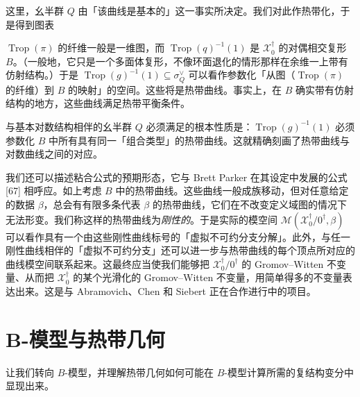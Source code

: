 这里，幺半群 $Q$ 由「该曲线是基本的」这一事实所决定。我们对此作热带化，于是得到图表
\begin{center}
\end{center}

$\operatorname{Trop}(\pi)$ 的纤维一般是一维图，而 $\operatorname{Trop}(q)^{-1}(1)$ 是 $\mathcal{X}_0^\dagger$ 的对偶相交复形 $B$。（一般地，它只是一个多面体复形，不像环面退化的情形那样在余维一上带有仿射结构。）于是 $\operatorname{Trop}(g)^{-1}(1)\subseteq\sigma_Q^\vee$ 可以看作参数化「从图（$\operatorname{Trop}(\pi)$ 的纤维）到 $B$ 的映射」的空间。这些将是热带曲线。事实上，在 $B$ 确实带有仿射结构的地方，这些曲线满足热带平衡条件。

与基本对数结构相伴的幺半群 $Q$ 必须满足的根本性质是：$\operatorname{Trop}(g)^{-1}(1)$ 必须参数化 $B$ 中所有具有同一「组合类型」的热带曲线。这就精确刻画了热带曲线与对数曲线之间的对应。

我们还可以描述粘合公式的预期形态，它与 Brett Parker 在其设定中发展的公式 [67] 相呼应。如上考虑 $B$ 中的热带曲线。这些曲线一般成族移动，但对任意给定的数据 $\beta$，总会有有限多条代表 $\beta$ 的热带曲线，它们在不改变定义域图的情况下无法形变。我们称这样的热带曲线为\emph{刚性的}。于是实际的模空间 $\mathcal{M}(\mathcal{X}_0^\dagger/0^\dagger,\beta)$ 可以看作具有一个由这些刚性曲线标号的「虚拟不可约分支分解」。此外，与任一刚性曲线相伴的「虚拟不可约分支」还可以进一步与热带曲线的每个顶点所对应的曲线模空间联系起来。这最终应当使我们能够把 $\mathcal{X}_0^\dagger/0^\dagger$ 的 Gromov--Witten 不变量、从而把 $\mathcal{X}_0^\dagger$ 的某个光滑化的 Gromov--Witten 不变量，用简单得多的不变量表达出来。这是与 Abramovich、Chen 和 Siebert 正在合作进行中的项目。

\section{B-模型与热带几何}
让我们转向 $B$-模型，并理解热带几何如何可能在 $B$-模型计算所需的复结构变分中显现出来。

